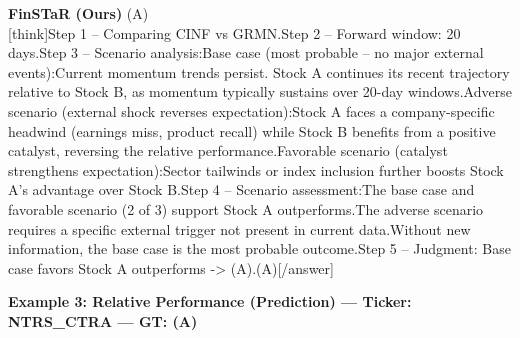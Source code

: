 \begin{minipage}[t]{0.41\textwidth}
\colorbox{green!10}{\parbox{\dimexpr\textwidth-2\fboxsep}{
\textbf{FinSTaR (Ours)} \textcolor{green!50!black}{(A)} \\[2pt]
\tiny
[think]\newline Step 1 -- Comparing CINF vs GRMN.\newline Step 2 -- Forward window: 20 days.\newline Step 3 -- Scenario analysis:\newline   Base case (most probable -- no major external events):\newline     Current momentum trends persist. Stock A continues its recent trajectory relative to Stock B, as momentum typically sustains over 20-day windows.\newline   Adverse scenario (external shock reverses expectation):\newline     Stock A faces a company-specific headwind (earnings miss, product recall) while Stock B benefits from a positive catalyst, reversing the relative performance.\newline   Favorable scenario (catalyst strengthens expectation):\newline     Sector tailwinds or index inclusion further boosts Stock A's advantage over Stock B.\newline Step 4 -- Scenario assessment:\newline   The base case and favorable scenario (2 of 3) support Stock A outperforms.\newline   The adverse scenario requires a specific external trigger not present in current data.\newline   Without new information, the base case is the most probable outcome.\newline Step 5 -- Judgment: Base case favors Stock A outperforms -> (A).\newline [/think]\newline [answer](A)[/answer]
}}
\end{minipage}
\vspace{8pt}


\noindent
\textbf{Example 3: Relative Performance (Prediction) --- Ticker: NTRS\_CTRA --- GT: (A)}
\vspace{2pt}


